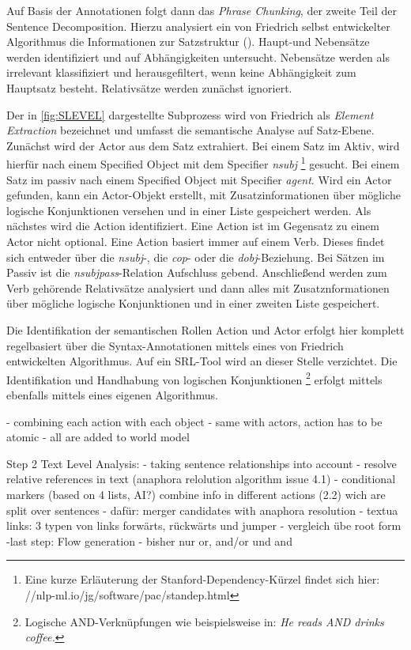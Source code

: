 Auf Basis der Annotationen folgt dann das \textit{Phrase Chunking}, der zweite Teil der Sentence Decomposition. Hierzu analysiert ein von Friedrich selbst entwickelter Algorithmus die Informationen zur Satzstruktur (\cite[vgl.][49]{FRIEDRICH2}). Haupt-und Nebensätze werden identifiziert und  auf Abhängigkeiten untersucht. Nebensätze werden als irrelevant klassifiziert und herausgefiltert, wenn keine Abhängigkeit zum Hauptsatz besteht. Relativsätze werden zunächst ignoriert.
\par
Der in \ref{fig:SLEVEL} dargestellte Subprozess wird von Friedrich als \textit{Element Extraction} bezeichnet und umfasst die semantische Analyse auf Satz-Ebene. Zunächst wird der Actor aus dem Satz extrahiert. Bei einem Satz im Aktiv, wird hierfür nach einem Specified Object mit dem Specifier \textit{nsubj} \footnote{Eine kurze Erläuterung der Stanford-Dependency-Kürzel findet sich hier: //nlp-ml.io/jg/software/pac/standep.html} gesucht. Bei einem Satz im passiv nach einem Specified Object mit Specifier \textit{agent}. Wird ein Actor gefunden, kann ein Actor-Objekt erstellt, mit Zusatzinformationen über mögliche logische Konjunktionen versehen und in einer Liste gespeichert werden. Als nächstes wird die Action identifiziert.  Eine Action ist im Gegensatz zu einem Actor nicht optional. Eine Action basiert immer auf einem Verb. Dieses findet sich entweder über die \textit{nsubj}-, die \textit{cop}- oder die \textit{dobj}-Beziehung. Bei Sätzen im Passiv ist die \textit{nsubjpass}-Relation Aufschluss gebend. Anschließend werden zum Verb gehörende Relativsätze analysiert und dann alles mit Zusatznformationen über mögliche logische Konjunktionen und in einer zweiten Liste gespeichert.
\par
Die Identifikation der semantischen Rollen Action und Actor erfolgt hier komplett regelbasiert über die Syntax-Annotationen mittels eines von Friedrich entwickelten Algorithmus. Auf ein \ac{SRL}-Tool wird an dieser Stelle verzichtet. Die Identifikation und Handhabung von logischen Konjunktionen \footnote{Logische AND-Verknüpfungen wie beispielsweise in: \textit{He reads AND drinks coffee.}} erfolgt mittels ebenfalls mittels eines eigenen Algorithmus.


- combining each action with each object
- same with actors, action has to be atomic
- all are added to world model

Step 2 Text Level Analysis:
- taking sentence relationships into account
- resolve relative references in text (anaphora relolution algorithm issue 4.1)
- conditional markers (based on 4 lists, AI?)
combine info in different actions (2.2) wich are split over sentences
- dafür: merger candidates with anaphora resolution
- textua links: 3 typen von links forwärts, rückwärts und jumper
- vergleich übe root form
-last step: Flow generation
- bisher nur or, and/or und and


